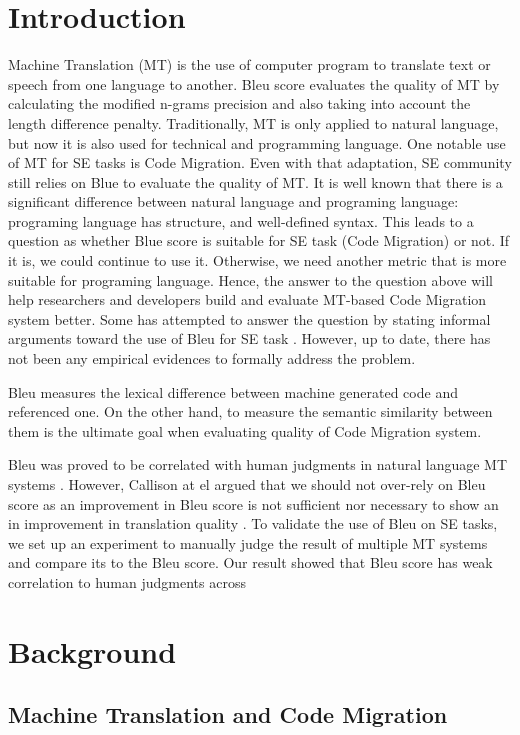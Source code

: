 \section{Introduction}
Machine Translation (MT) is the use of computer program to translate text or speech from one language to another. Bleu score evaluates the quality of MT by calculating the modified n-grams precision and also taking into account the length difference penalty. Traditionally, MT is only applied to natural language, but now it is also used for technical and programming language. One notable use of MT for SE tasks is Code Migration. Even with that adaptation, SE community still relies on Blue to evaluate the quality of MT. It is well known that there is a significant difference between natural language and programing language: programing language has structure, and well-defined syntax. This leads to a question as whether Blue score is suitable for SE task (Code Migration) or not. If it  is, we could continue to use it. Otherwise, we need another metric that is more suitable for programing language. Hence, the answer to the question above will help researchers and developers build and evaluate MT-based Code Migration system better. Some has attempted to answer the question by stating informal arguments toward the use of Bleu for SE task \cite{}. However, up to date, there has not been any empirical evidences to formally address the problem. 

Bleu measures the lexical difference between machine generated code and referenced one. On the other hand, to measure the semantic similarity between them is the ultimate goal when evaluating quality of Code Migration system. 
 

Bleu was proved to be correlated with human judgments in natural language MT systems \cite {Papineni02}. However, Callison at el argued that we should not over-rely on Bleu score as an improvement in Bleu score is not sufficient nor necessary to show an in improvement in translation quality \cite {Callison06}. To validate the use of Bleu on SE tasks, we set up an experiment to manually judge the result of multiple MT systems and compare its to the Bleu score. Our result showed that Bleu score has weak correlation to human judgments across 

\section{Background}
\subsection{Machine Translation and Code Migration}
